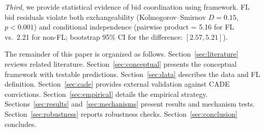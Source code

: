 \emph{Third}, we provide statistical evidence of bid coordination using
\cites{bajari2003deciding} framework. FL bid residuals violate both
exchangeability (Kolmogorov--Smirnov $D = 0.15$, $p < 0.001$) and
conditional independence (pairwise product = 5.16 for FL vs.\ 2.21 for
non-FL; bootstrap 95\% CI for the difference: $[2.57, 5.21]$).

The remainder of this paper is organized as follows.
Section~\ref{sec:literature} reviews related literature.
Section~\ref{sec:conceptual} presents the conceptual framework with
testable predictions. Section~\ref{sec:data} describes the data and FL
definition. Section~\ref{sec:cade} provides external validation against
CADE convictions. Section~\ref{sec:empirical} details the empirical
strategy. Sections~\ref{sec:results} and~\ref{sec:mechanisms} present
results and mechanism tests. Section~\ref{sec:robustness} reports
robustness checks. Section~\ref{sec:conclusion} concludes.
